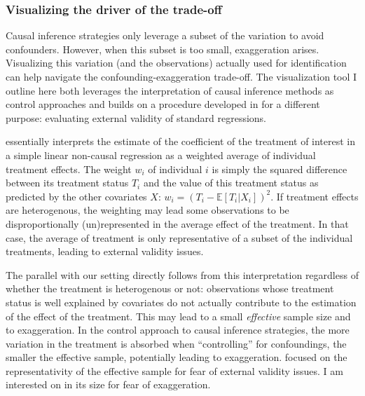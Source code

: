 \documentclass[usletter, 12pt]{article}
\begin{document}
			\subsubsection{Visualizing the driver of the trade-off}
		
				Causal inference strategies only leverage a subset of the variation to avoid confounders. However, when this subset is too small, exaggeration arises. Visualizing this variation (and the observations) actually used for identification can help navigate the confounding-exaggeration trade-off. The visualization tool I outline here both leverages the interpretation of causal inference methods as control approaches and builds on a procedure developed in \cite{aronow_does_2016} for a different purpose: evaluating external validity of standard regressions.
				
				\cite{aronow_does_2016} essentially interprets the estimate of the coefficient of the treatment of interest in a simple linear non-causal regression as a weighted average of individual treatment effects. The weight $w_{i}$ of individual $i$ is simply the squared difference between its treatment status $T_{i}$ and the value of this treatment status as predicted by the other covariates $X$: $w_{i} = (T_{i} - \mathbb{E}[T_{i} | X_{i}])^{2}$. If treatment effects are heterogenous, the weighting may lead some observations to be disproportionally (un)represented in the average effect of the treatment. %
				In that case, the average of treatment is only representative of a subset of the individual treatments, leading to external validity issues. 
				
				The parallel with our setting directly follows from this interpretation regardless of whether the treatment is heterogenous or not: observations whose treatment status is well explained by covariates do not actually contribute to the estimation of the effect of the treatment. This may lead to a small \textit{effective} sample size and to exaggeration. In the control approach to causal inference strategies, the more variation in the treatment is absorbed when ``controlling'' for confoundings, the smaller the effective sample, potentially leading to exaggeration. \cite{aronow_does_2016} focused on the representativity of the effective sample for fear of external validity issues. I am interested on in its size for fear of exaggeration.
				
\end{document}
